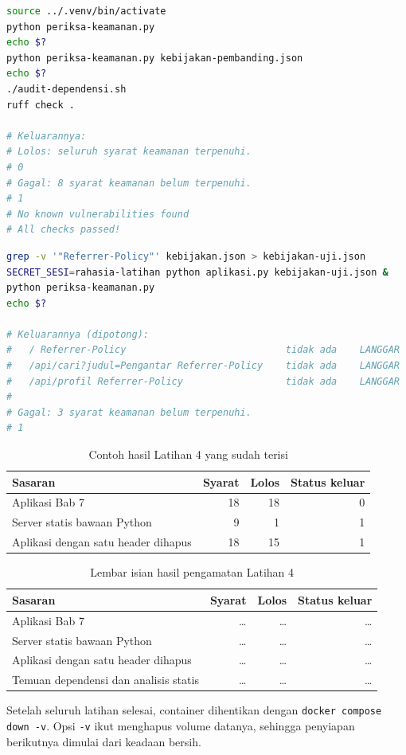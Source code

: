 \begin{lstlisting}[language=bash, caption={Menjalankan gate pada dua sasaran, tersedia di \berkas{sources/chapter07/periksa-keamanan.py}}, label={lst:c7-lat4-jalan}]
source ../.venv/bin/activate
python periksa-keamanan.py
echo $?
python periksa-keamanan.py kebijakan-pembanding.json
echo $?
./audit-dependensi.sh
ruff check .

# Keluarannya:
# Lolos: seluruh syarat keamanan terpenuhi.
# 0
# Gagal: 8 syarat keamanan belum terpenuhi.
# 1
# No known vulnerabilities found
# All checks passed!
\end{lstlisting}

\begin{lstlisting}[language=bash, caption={Aplikasi yang kehilangan satu header, memakai \berkas{sources/chapter07/aplikasi.py}}, label={lst:c7-lat4-hapus}]
grep -v '"Referrer-Policy"' kebijakan.json > kebijakan-uji.json
SECRET_SESI=rahasia-latihan python aplikasi.py kebijakan-uji.json &
python periksa-keamanan.py
echo $?

# Keluarannya (dipotong):
#   / Referrer-Policy                            tidak ada    LANGGAR
#   /api/cari?judul=Pengantar Referrer-Policy    tidak ada    LANGGAR
#   /api/profil Referrer-Policy                  tidak ada    LANGGAR
#
# Gagal: 3 syarat keamanan belum terpenuhi.
# 1
\end{lstlisting}

\begin{table}[!htb]
  \centering
  \caption{Contoh hasil Latihan 4 yang sudah terisi}
  \label{tab:c7-lat4-contoh}
  \begin{tabularx}{\textwidth}{Xrrr}
    \hline
    \textbf{Sasaran} & \textbf{Syarat} & \textbf{Lolos} & \textbf{Status keluar} \\
    \hline
    Aplikasi Bab 7 & 18 & 18 & 0 \\
    \hline
    Server statis bawaan Python & 9 & 1 & 1 \\
    \hline
    Aplikasi dengan satu header dihapus & 18 & 15 & 1 \\
    \hline
  \end{tabularx}
\end{table}

\begin{table}[!htb]
  \centering
  \caption{Lembar isian hasil pengamatan Latihan 4}
  \label{tab:c7-lat4-hasil}
  \begin{tabularx}{\textwidth}{Xrrr}
    \hline
    \textbf{Sasaran} & \textbf{Syarat} & \textbf{Lolos} & \textbf{Status keluar} \\
    \hline
    Aplikasi Bab 7 & \dots & \dots & \dots \\
    \hline
    Server statis bawaan Python & \dots & \dots & \dots \\
    \hline
    Aplikasi dengan satu header dihapus & \dots & \dots & \dots \\
    \hline
    Temuan dependensi dan analisis statis & \dots & \dots & \dots \\
    \hline
  \end{tabularx}
\end{table}

Setelah seluruh latihan selesai, container dihentikan dengan
\texttt{docker compose down -v}. Opsi \texttt{-v} ikut menghapus volume
datanya, sehingga penyiapan berikutnya dimulai dari keadaan bersih.
